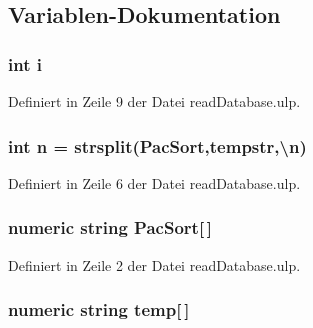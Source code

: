 \subsection{Variablen-\/\+Dokumentation}
\hypertarget{read_database_8ulp_acb559820d9ca11295b4500f179ef6392}{}
\subsubsection[{i}]{\setlength{\rightskip}{0pt plus 5cm}int i}\label{read_database_8ulp_acb559820d9ca11295b4500f179ef6392}


Definiert in Zeile 9 der Datei read\+Database.\+ulp.

\hypertarget{read_database_8ulp_a76f11d9a0a47b94f72c2d0e77fb32240}{}
\subsubsection[{n}]{\setlength{\rightskip}{0pt plus 5cm}int n = strsplit({\bf Pac\+Sort},{\bf tempstr},\textquotesingle{}\textbackslash{}n\textquotesingle{})}\label{read_database_8ulp_a76f11d9a0a47b94f72c2d0e77fb32240}


Definiert in Zeile 6 der Datei read\+Database.\+ulp.

\hypertarget{read_database_8ulp_a7888d3b2f277351256d2bd32cd3ae937}{}
\subsubsection[{Pac\+Sort}]{\setlength{\rightskip}{0pt plus 5cm}numeric string Pac\+Sort\mbox{[}$\,$\mbox{]}}\label{read_database_8ulp_a7888d3b2f277351256d2bd32cd3ae937}


Definiert in Zeile 2 der Datei read\+Database.\+ulp.

\hypertarget{read_database_8ulp_a864977f9124ed93d5049882a1bae98ee}{}
\subsubsection[{temp}]{\setlength{\rightskip}{0pt plus 5cm}numeric string temp\mbox{[}$\,$\mbox{]}}\label{read_database_8ulp_a864977f9124ed93d5049882a1bae98ee}


